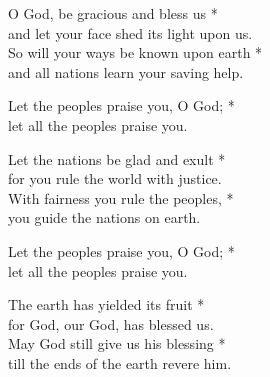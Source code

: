 O God, be gracious and bless us *\\
and let your face shed its light upon us.\\
So will your ways be known upon earth *\\
and all nations learn your saving help.

Let the peoples praise you, O God; *\\
let all the peoples praise you.

Let the nations be glad and exult *\\
for you rule the world with justice.\\
With fairness you rule the peoples, *\\
you guide the nations on earth.

Let the peoples praise you, O God; *\\
let all the peoples praise you.

The earth has yielded its fruit *\\
for God, our God, has blessed us.\\
May God still give us his blessing *\\
till the ends of the earth revere him.
